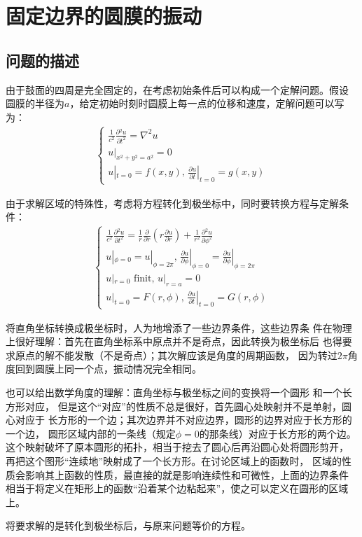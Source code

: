 \documentclass[a4paper]{ctexart}
\newcommand{\mr}[1]{\mathrm{#1}}
\newcommand{\pdv}[2]{\frac{\partial{#1}}{\partial{#2}}}
\begin{document}
	\section{固定边界的圆膜的振动}
	\subsection{问题的描述}
	由于鼓面的四周是完全固定的，在考虑初始条件后可以构成一个定解问题。假设
	圆膜的半径为$a$，给定初始时刻时圆膜上每一点的位移和速度，定解问题可以写为：
	\begin{align}
		\left\{
			\begin{array}{lr}
				\displaystyle\frac{1}{c^2}\pdv{^{2}u}{t^2} = \nabla^{2}u\\
				\displaystyle u|_{x^2 + y^2 = a^2} = 0\\
				\displaystyle u|_{t=0} = f(x, y),\, \pdv{u}{t}|_{t=0} = g(x, y)
			\end{array}
		\right.
	\end{align}
	\par 由于求解区域的特殊性，考虑将方程转化到极坐标中，同时要转换方程与定解条件：
	\begin{align}
		\left\{
			\begin{array}{lr}
				\displaystyle\frac{1}{c^2}\pdv{^{2}u}{t^2} = \frac{1}{r}\pdv{}{r}\left(r\pdv{u}{r}\right) + \frac{1}{r^2}\pdv{^2 u}{\phi^{2}}\\
				\displaystyle u|_{\phi=0} = u|_{\phi=2\pi},\, \left.\pdv{u}{\phi}\right|_{\phi=0} = \left.\pdv{u}{\phi}\right|_{\phi=2\pi}\\
				\displaystyle u|_{r=0}\,\,\mr{finit},\, u|_{r=a}=0\\
				\displaystyle u|_{t=0} = F(r, \phi),\, \left.\pdv{u}{t}\right|_{t=0} = G(r, \phi)
			\end{array}
			\label{wave eq of drum}
		\right.
	\end{align}
	\par 将直角坐标转换成极坐标时，人为地增添了一些边界条件，这些边界条
	件在物理上很好理解：首先在直角坐标系中原点并不是奇点，因此转换为极坐标后
	也得要求原点的解不能发散（不是奇点）；其次解应该是角度的周期函数，
	因为转过$2\pi$角度回到圆膜上同一个点，振动情况完全相同。
	\par 也可以给出数学角度的理解：直角坐标与极坐标之间的变换将一个圆形
	和一个长方形对应，
	但是这个“对应”的性质不总是很好，首先圆心处映射并不是单射，圆心对应于
	长方形的一个边；其次边界并不对应边界，圆形的边界对应于长方形的一个边，
	圆形区域内部的一条线（规定$\phi=0$的那条线）对应于长方形的两个边。
	这个映射破坏了原本圆形的拓扑，相当于挖去了圆心后再沿圆心处将圆形剪开，
	再把这个图形“连续地”映射成了一个长方形。在讨论区域上的函数时，
	区域的性质会影响其上函数的性质，最直接的就是影响连续性和可微性，上面的边界条件
	相当于将定义在矩形上的函数“沿着某个边粘起来”，使之可以定义在圆形的区域上。
	\par 将要求解的是转化到极坐标后，与原来问题等价的方程。
\end{document}
